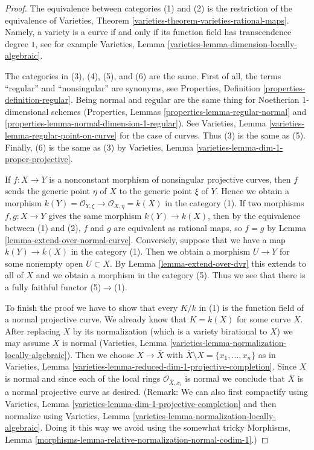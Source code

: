 \begin{proof}
The equivalence between categories (1) and (2) is the restriction of the
equivalence of
Varieties, Theorem \ref{varieties-theorem-varieties-rational-maps}.
Namely, a variety is a curve if and only if its function field has
transcendence degree $1$, see for example
Varieties, Lemma \ref{varieties-lemma-dimension-locally-algebraic}.

\medskip\noindent
The categories in (3), (4), (5), and (6) are the same. First of all, the
terms ``regular'' and ``nonsingular'' are synonyms, see
Properties, Definition \ref{properties-definition-regular}.
Being normal and regular are the same thing for Noetherian
$1$-dimensional schemes
(Properties, Lemmas \ref{properties-lemma-regular-normal} and
\ref{properties-lemma-normal-dimension-1-regular}). See
Varieties, Lemma \ref{varieties-lemma-regular-point-on-curve}
for the case of curves. Thus (3) is the same as (5). Finally, (6)
is the same as (3) by
Varieties, Lemma \ref{varieties-lemma-dim-1-proper-projective}.

\medskip\noindent
If $f : X \to Y$ is a nonconstant morphism of nonsingular projective curves,
then $f$ sends the generic point $\eta$ of $X$ to the generic point $\xi$ of
$Y$. Hence we obtain a morphism
$k(Y) = \mathcal{O}_{Y, \xi} \to \mathcal{O}_{X, \eta} = k(X)$
in the category (1). If two morphisms $f,g: X \to Y$ gives the same morphism
$k(Y) \to k(X)$, then by the equivalence between (1) and (2),
$f$ and $g$ are equivalent as rational maps, so $f=g$ by
Lemma \ref{lemma-extend-over-normal-curve}.
Conversely, suppose that we have a map
$k(Y) \to k(X)$ in the category (1). Then we obtain a morphism $U \to Y$
for some nonempty open $U \subset X$. By Lemma \ref{lemma-extend-over-dvr}
this extends to all of $X$ and we obtain a morphism in the category (5).
Thus we see that there is a fully faithful functor (5)$\to$(1).

\medskip\noindent
To finish the proof we have to show that every $K/k$ in (1)
is the function field of a normal projective curve.
We already know that $K = k(X)$ for some curve $X$.
After replacing $X$ by its normalization
(which is a variety birational to $X$)
we may assume $X$ is normal
(Varieties, Lemma \ref{varieties-lemma-normalization-locally-algebraic}).
Then we choose $X \to \overline{X}$ with
$\overline{X} \setminus X = \{x_1, \ldots, x_n\}$ as in
Varieties, Lemma \ref{varieties-lemma-reduced-dim-1-projective-completion}.
Since $X$ is normal and since each
of the local rings $\mathcal{O}_{\overline{X}, x_i}$ is normal
we conclude that $\overline{X}$ is a normal projective curve as desired.
(Remark: We can also first compactify using
Varieties, Lemma \ref{varieties-lemma-dim-1-projective-completion}
and then normalize using
Varieties, Lemma \ref{varieties-lemma-normalization-locally-algebraic}.
Doing it this way we avoid using the somewhat tricky
Morphisms, Lemma \ref{morphisms-lemma-relative-normalization-normal-codim-1}.)
\end{proof}

